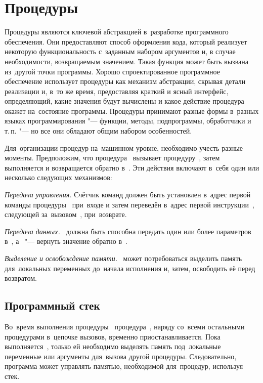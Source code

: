 
\chapter{Процедуры}
Процедуры являются ключевой абстракцией в~разработке программного обеспечения. Они предоставляют способ оформления кода, который реализует некоторую функциональность с~заданным набором аргументов и, в случае необходимости, возвращаемым значением. Такая функция может быть вызвана из~другой точки программы. Хорошо спроектированное программное обеспечение использует процедуры как механизм абстракции, скрывая детали реализации и, в~то же время, предоставляя краткий и ясный интерфейс, определяющий, какие значения будут вычислены и какое действие процедура окажет на~состояние программы. Процедуры принимают разные формы в~разных языках программирования "--- функции, методы, подпрограммы, обработчики и т.\,п. "--- но все они обладают общим набором особенностей.

Для~организации процедур на~машинном уровне, необходимо учесть разные моменты. Предположим, что процедура~ вызывает процедуру~, затем~ выполняется и возвращается обратно в~. Эти действия включают в~себя один или несколько следующих механизмов:

{\parindent=0.5cm%
%
\smallskip
\hangindent=1.5cm
\emph{Передача управления.} Счётчик команд должен быть установлен в~адрес первой команды процедуры~ при~входе и затем переведён в~адрес первой инструкции~, следующей за~вызовом~, при~возврате.

\smallskip
\hangindent=1.5cm
\emph{Передача данных.} ~должна быть способна передать один или более параметров в~, а~ "--- вернуть значение обратно в~.

\smallskip
\hangindent=1.5cm
\emph{Выделение и освобождение памяти.} ~может потребоваться выделить память для~локальных переменных до~начала исполнения и, затем, освободить её перед возвратом.

}



\section{Программный стек}
Во~время выполнения процедуры~ процедура~, наряду со~всеми остальными процедурами в~цепочке вызовов, временно приостанавливается. Пока выполняется~, только ей необходимо выделять память под~локальные переменные или аргументы для~вызова другой процедуры. Следовательно, программа может управлять памятью, необходимой для~процедур, используя стек.

